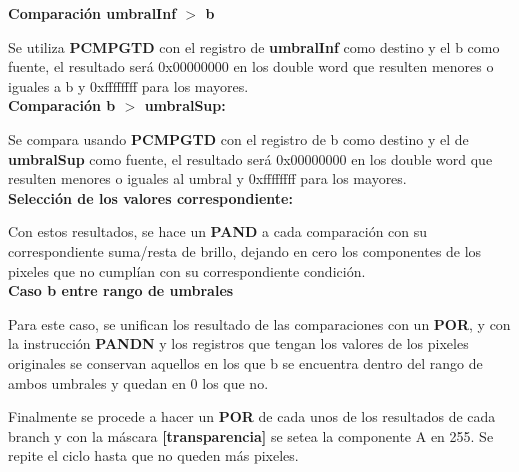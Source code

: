 {\centering\textbf{Comparación umbralInf $>$ b}}

Se utiliza \textbf{PCMPGTD} con el registro de \textbf{umbralInf} como destino y el b como fuente, el resultado será 0x00000000 en los double word que resulten menores o iguales a b y 0xffffffff para los mayores. \\

{\centering\textbf{Comparación b $>$ umbralSup:}}

Se compara usando \textbf{PCMPGTD} con el registro de b como destino y el de \textbf{umbralSup} como fuente, el resultado será 0x00000000 en los double word que resulten menores o iguales al umbral y 0xffffffff para los mayores.\\

{\centering\textbf{Selección de los valores correspondiente:}}

Con estos resultados, se hace un \textbf{PAND} a cada comparación con su correspondiente suma/resta de brillo, dejando en cero los componentes de los pixeles que no cumplían con su correspondiente condición. \\

{\centering\textbf{Caso b entre rango de umbrales}}

Para este caso, se unifican  los resultado de las comparaciones con un \textbf{POR}, y con la instrucción \textbf{PANDN} y los registros que tengan los valores de los pixeles originales se conservan aquellos en los que b se encuentra dentro del rango de ambos umbrales y quedan en 0 los que no.

\medskip

Finalmente se procede a hacer un \textbf{POR} de cada unos de los resultados de cada branch y con la máscara \textbf{[transparencia]} se setea la componente A en 255.
Se repite el ciclo hasta que no queden más pixeles.
